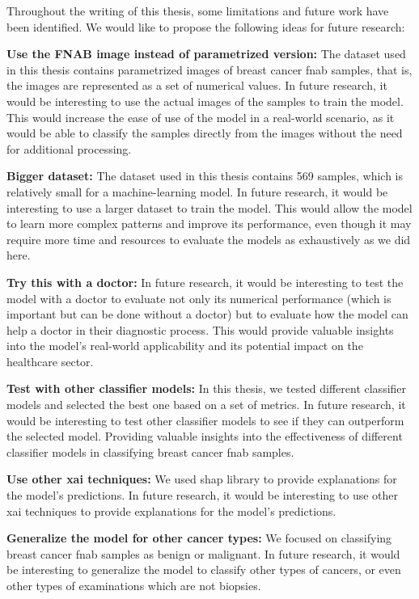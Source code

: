 Throughout the writing of this thesis, some limitations and future work have been identified. We would like to propose the following ideas for future research:

\textbf{Use the FNAB image instead of parametrized version:} The dataset used in this thesis contains parametrized images of breast cancer \ac{fnab} samples, that is, the images are represented as a set of numerical values. In future research, it would be interesting to use the actual images of the samples to train the model. This would increase the ease of use of the model in a real-world scenario, as it would be able to classify the samples directly from the images without the need for additional processing.

\textbf{Bigger dataset:} The dataset used in this thesis contains 569 samples, which is relatively small for a machine-learning model. In future research, it would be interesting to use a larger dataset to train the model. This would allow the model to learn more complex patterns and improve its performance, even though it may require more time and resources to evaluate the models as exhaustively as we did here.

\textbf{Try this with a doctor:} In future research, it would be interesting to test the model with a doctor to evaluate not only its numerical performance (which is important but can be done without a doctor) but to evaluate how the model can help a doctor in their diagnostic process. This would provide valuable insights into the model's real-world applicability and its potential impact on the healthcare sector.

\textbf{Test with other classifier models:} In this thesis, we tested different classifier models and selected the best one based on a set of metrics. In future research, it would be interesting to test other classifier models to see if they can outperform the selected model. 
Providing valuable insights into the effectiveness of different classifier models in classifying breast cancer \ac{fnab} samples.

\textbf{Use other \ac{xai} techniques:} We used \ac{shap} library to provide explanations for the model's predictions. In future research, it would be interesting to use other \ac{xai} techniques to provide explanations for the model's predictions.

\textbf{Generalize the model for other cancer types:} We focused on classifying breast cancer \ac{fnab} samples as benign or malignant. In future research, it would be interesting to generalize the model to classify other types of cancers, or even other types of examinations which are not biopsies.